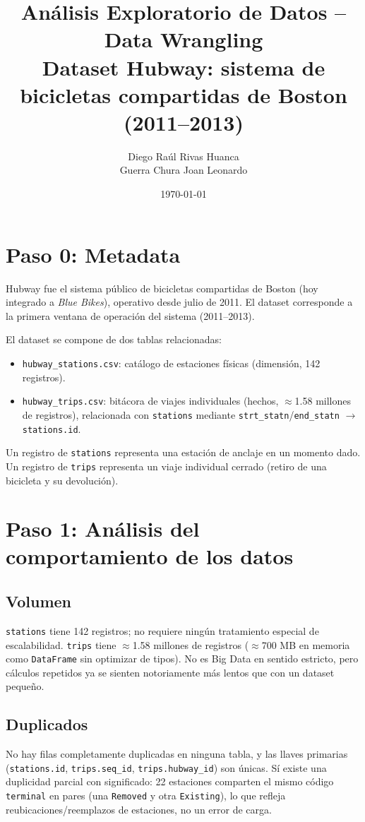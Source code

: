 \documentclass[11pt,a4paper]{article}
\title{Análisis Exploratorio de Datos -- Data Wrangling \\
\large Dataset Hubway: sistema de bicicletas compartidas de Boston (2011--2013)}
\author{Diego Raúl Rivas Huanca \\
Guerra Chura Joan Leonardo \\
}
\date{\today}
\begin{document}
\maketitle

\section*{Paso 0: Metadata}

Hubway fue el sistema público de bicicletas compartidas de Boston (hoy integrado a \textit{Blue Bikes}),
operativo desde julio de 2011. El dataset corresponde a la primera ventana de operación del sistema
(2011--2013).

El dataset se compone de dos tablas relacionadas:
\begin{itemize}
  \item \texttt{hubway\_stations.csv}: catálogo de estaciones físicas (dimensión, 142 registros).
  \item \texttt{hubway\_trips.csv}: bitácora de viajes individuales (hechos, $\approx$1.58 millones de registros),
  relacionada con \texttt{stations} mediante \texttt{strt\_statn}/\texttt{end\_statn} $\rightarrow$ \texttt{stations.id}.
\end{itemize}

Un registro de \texttt{stations} representa una estación de anclaje en un momento dado. Un registro de
\texttt{trips} representa un viaje individual cerrado (retiro de una bicicleta y su devolución).

\section*{Paso 1: Análisis del comportamiento de los datos}

\subsection*{Volumen}
\texttt{stations} tiene 142 registros; no requiere ningún tratamiento especial de escalabilidad.
\texttt{trips} tiene $\approx$1.58 millones de registros ($\approx$700 MB en memoria como \texttt{DataFrame}
sin optimizar de tipos). No es Big Data en sentido estricto, pero cálculos repetidos ya se sienten notoriamente
más lentos que con un dataset pequeño.

\subsection*{Duplicados}
No hay filas completamente duplicadas en ninguna tabla, y las llaves primarias (\texttt{stations.id},
\texttt{trips.seq\_id}, \texttt{trips.hubway\_id}) son únicas. Sí existe una duplicidad parcial con significado:
22 estaciones comparten el mismo código \texttt{terminal} en pares (una \texttt{Removed} y otra
\texttt{Existing}), lo que refleja reubicaciones/reemplazos de estaciones, no un error de carga.
\end{document}
